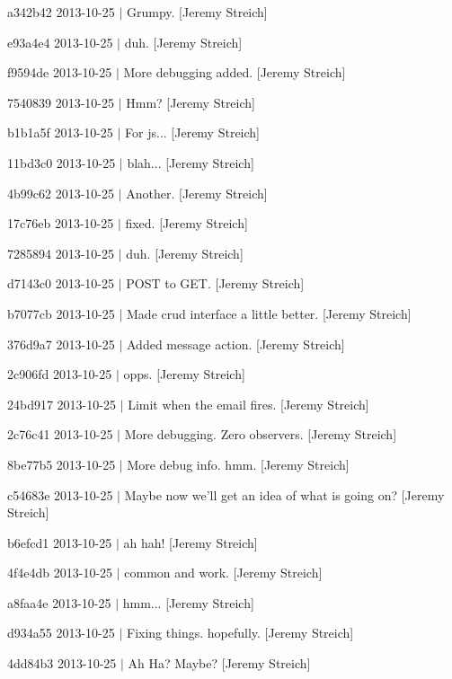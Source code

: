 \begin{DoxyItemize}
\item a342b42 2013-\/10-\/25 $|$ Grumpy. \mbox{[}Jeremy Streich\mbox{]}
\item e93a4e4 2013-\/10-\/25 $|$ duh. \mbox{[}Jeremy Streich\mbox{]}
\item f9594de 2013-\/10-\/25 $|$ More debugging added. \mbox{[}Jeremy Streich\mbox{]}
\item 7540839 2013-\/10-\/25 $|$ Hmm? \mbox{[}Jeremy Streich\mbox{]}
\item b1b1a5f 2013-\/10-\/25 $|$ For js... \mbox{[}Jeremy Streich\mbox{]}
\item 11bd3c0 2013-\/10-\/25 $|$ blah... \mbox{[}Jeremy Streich\mbox{]}
\item 4b99c62 2013-\/10-\/25 $|$ Another. \mbox{[}Jeremy Streich\mbox{]}
\item 17c76eb 2013-\/10-\/25 $|$ fixed. \mbox{[}Jeremy Streich\mbox{]}
\item 7285894 2013-\/10-\/25 $|$ duh. \mbox{[}Jeremy Streich\mbox{]}
\item d7143c0 2013-\/10-\/25 $|$ P\-O\-S\-T to G\-E\-T. \mbox{[}Jeremy Streich\mbox{]}
\item b7077cb 2013-\/10-\/25 $|$ Made crud interface a little better. \mbox{[}Jeremy Streich\mbox{]}
\item 376d9a7 2013-\/10-\/25 $|$ Added message action. \mbox{[}Jeremy Streich\mbox{]}
\item 2c906fd 2013-\/10-\/25 $|$ opps. \mbox{[}Jeremy Streich\mbox{]}
\item 24bd917 2013-\/10-\/25 $|$ Limit when the email fires. \mbox{[}Jeremy Streich\mbox{]}
\item 2c76c41 2013-\/10-\/25 $|$ More debugging. Zero observers. \mbox{[}Jeremy Streich\mbox{]}
\item 8be77b5 2013-\/10-\/25 $|$ More debug info. hmm. \mbox{[}Jeremy Streich\mbox{]}
\item c54683e 2013-\/10-\/25 $|$ Maybe now we'll get an idea of what is going on? \mbox{[}Jeremy Streich\mbox{]}
\item b6efcd1 2013-\/10-\/25 $|$ ah hah! \mbox{[}Jeremy Streich\mbox{]}
\item 4f4e4db 2013-\/10-\/25 $|$ common and work. \mbox{[}Jeremy Streich\mbox{]}
\item a8faa4e 2013-\/10-\/25 $|$ hmm... \mbox{[}Jeremy Streich\mbox{]}
\item d934a55 2013-\/10-\/25 $|$ Fixing things. hopefully. \mbox{[}Jeremy Streich\mbox{]}
\item 4dd84b3 2013-\/10-\/25 $|$ Ah Ha? Maybe? \mbox{[}Jeremy Streich\mbox{]}

\end{DoxyItemize}
